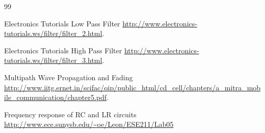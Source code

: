 \documentclass[a4paper, 12pt, english]{article}
\begin{document}

\patchcmd{\thebibliography}{\section*}{\section}{}{}
\begin{thebibliography}{99}

	Electronics Tutorials Low Pass Filter
	\url{http://www.electronics-tutorials.ws/filter/filter_2.html}.
    
	Electronics Tutorials High Pass Filter
	\url{http://www.electronics-tutorials.ws/filter/filter_3.html}.
  
	Multipath Wave Propagation
and Fading
\url{http://www.iitg.ernet.in/scifac/qip/public_html/cd_cell/chapters/a_mitra_mobile_communication/chapter5.pdf}.

	Frequency response of RC and LR circuits 
	\url{http://www.ece.sunysb.edu/~oe/Leon/ESE211/Lab05}

\end{thebibliography}
\noindent
\end{document}
